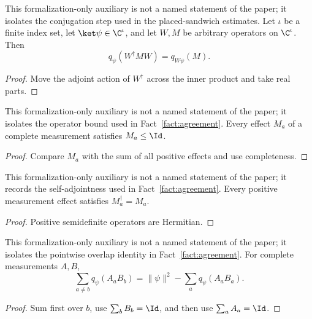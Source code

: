 \begin{lemma}
	\label{lem:distance-qform-conjugation}
	\leanok
	This formalization-only auxiliary is not a named statement of the paper; it
	isolates the conjugation step used in the placed-sandwich estimates. Let
	$\iota$ be a finite index set, let $\ket\psi\in\C^\iota$, and let $W,M$ be
	arbitrary operators on $\C^\iota$. Then
	\[
		q_\psi(W^\dagger M W)=q_{W\psi}(M).
	\]
\end{lemma}
\begin{proof}
	\leanok
	Move the adjoint action of $W^\dagger$ across the inner product and take real
	parts.
\end{proof}

\begin{lemma}
	\label{lem:distance-measurement-effect-le-one}
	\leanok
	This formalization-only auxiliary is not a named statement of the paper; it
	isolates the operator bound used in Fact~\ref{fact:agreement}. Every effect
	$M_a$ of a complete measurement satisfies $M_a\leq\Id$.
\end{lemma}
\begin{proof}
	\leanok
	Compare $M_a$ with the sum of all positive effects and use completeness.
\end{proof}

\begin{lemma}
	\label{lem:distance-measurement-effect-hermitian}
	\leanok
	This formalization-only auxiliary is not a named statement of the paper; it
	records the self-adjointness used in Fact~\ref{fact:agreement}. Every
	positive measurement effect satisfies $M_a^\dagger=M_a$.
\end{lemma}
\begin{proof}
	\leanok
	Positive semidefinite operators are Hermitian.
\end{proof}

\begin{lemma}
	\label{lem:distance-point-defect}
	\leanok
	This formalization-only auxiliary is not a named statement of the paper; it
	isolates the pointwise overlap identity in Fact~\ref{fact:agreement}. For
	complete measurements $A,B$,
	\[
		\sum_{a\ne b}q_\psi(A_aB_b)
		=\|\psi\|^2-\sum_a q_\psi(A_aB_a).
	\]
\end{lemma}
\begin{proof}
	\leanok
	Sum first over $b$, use $\sum_b B_b=\Id$, and then use
	$\sum_a A_a=\Id$.
\end{proof}

